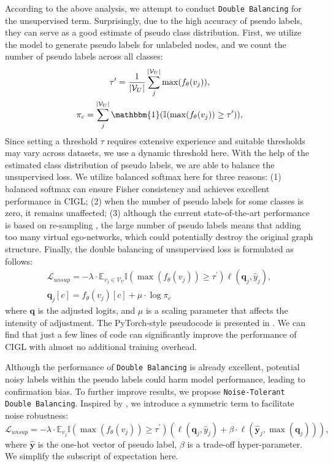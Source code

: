 According to the above analysis, we attempt to conduct \texttt{Double Balancing} for the unsupervised term. Surprisingly, due to the high accuracy of pseudo labels, they can serve as a good estimate of pseudo class distribution. First, we utilize the model to generate pseudo labels for unlabeled nodes, and we count the number of pseudo labels across all classes:
\begin{gather}
    \tau^\prime=\frac{1}{|\mathcal{V}_U|}\sum_j^{|\mathcal{V}_U|}\max(f_\theta(v_j)), \\
    \pi_c=\sum_j^{|\mathcal{V}_U|}\mathbbm{1}(\mathbb{I}(\max(f_\theta(v_j))\geq\tau^\prime)), 
\end{gather}
Since setting a threshold $\tau$ requires extensive experience and suitable thresholds may vary across datasets, we use a dynamic threshold here. With the help of the estimated class distribution of pseudo labels, we are able to balance the unsupervised loss. We utilize balanced softmax \cite{ren2020balanced} here for three reasons: (1) balanced softmax can ensure Fisher consistency and achieves excellent performance in CIGL; (2) when the number of pseudo labels for some classes is zero, it remains unaffected; (3) although the current state-of-the-art performance is based on re-sampling \cite{park2021graphens,li2023graphsha}, the large number of pseudo labels means that adding too many virtual ego-networks, which could potentially destroy the original graph structure. Finally, the double balancing of unsupervised loss is formulated as follows:
\begin{gather}
    \mathcal{L}_{unsup}=-\lambda\cdot\mathbb{E}_{v_j\in\mathcal{V}_U}\mathbb{I}(\max(f_\theta(v_j))\geq\tau^\prime)\ell(\mathbf{q}_j, \hat{y}_j), \\
    \mathbf{q}_j[c] = f_\theta(v_j)[c]+\mu\cdot\log\pi_{c}
\end{gather}
where $\mathbf{q}$ is the adjusted logits, and $\mu$ is a scaling parameter that affects the intensity of adjustment. The PyTorch-style pseudocode is presented in . We can find that just a few lines of code can significantly improve the performance of CIGL with almost no additional training overhead. 

Although the performance of \texttt{Double Balancing} is already excellent, potential noisy labels within the pseudo labels could harm model performance, leading to confirmation bias. To further improve results, we propose \texttt{Noise-Tolerant Double Balancing}. Inspired by \citet{wang2019symmetric}, we introduce a symmetric term to facilitate noise robustness:
\begin{equation}
    \mathcal{L}_{unsup}=-\lambda\cdot\mathbb{E}_{v_j}\mathbb{I}(\max(f_\theta(v_j))\geq\tau^\prime)(\ell(\mathbf{q}_j,\hat{y}_j)+\beta\cdot\ell(\hat{\mathbf{y}}_j, \max(\mathbf{q}_j))),
\end{equation}
where $\hat{\mathbf{y}}$ is the one-hot vector of pseudo label, $\beta$ is a trade-off hyper-parameter. We simplify the subscript of expectation here.

